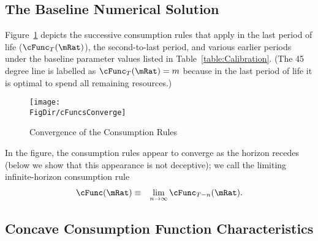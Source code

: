 \documentclass[titlepage]{\econtex}\providecommand{\texname}{BufferStockTheory}%
\providecommand{\FigDir}{Figures}
\providecommand{\TableDir}{./Tables}
\renewcommand{\FigDir}{Code/Python/Figures}
\begin{document}
\begin{comment}
In the case where the permanent shocks are lognormally distributed, we have
\begin{eqnarray}
\Ex[\pshk^{1-\CRRA}] & = &\exp((1-\CRRA)(-\sigma^{2}_{\pshk}/2)+(1-\CRRA)^{2}\sigma_{\pshk}^{2})
\\ & = & \exp((1-\CRRA)((-1/2)+(1-\CRRA))\sigma_{\pshk}^{2})
\\ & = & \exp((1-\CRRA)(1/2-\CRRA)\sigma_{\pshk}^{2})
%
\end{eqnarray}
\end{comment}

\begin{comment}
Equation
  \eqref{eq:GIC} can be raised to the $\CRRA$ power yielding the
  alternative form $(\Rfree \Discount) \PGroAdj^{-\CRRA} < 1$ which
  Deaton~\citeyearpar{deatonLiqConstr} imposed to guarantee that his
  problem defined a contraction mapping.
\end{comment}



\subsection{The Baseline Numerical Solution}

Figure~\ref{fig:CFuncsConverge} depicts the successive consumption
rules that apply in the last period of life ($\cFunc_{T}(\mRat)$), the
second-to-last period, and various earlier periods under the
baseline parameter values listed in Table~\ref{table:Calibration}.
(The 45 degree line is labelled as $\cFunc_{T}(\mRat) = m$ because in
the last period of life it is optimal to spend all remaining
resources.)



\begin{figure}[tbp]
\texttt{[image: \\FigDir/cFuncsConverge]}
\caption{Convergence of the Consumption Rules}
\label{fig:CFuncsConverge}
\end{figure}

In the figure, the consumption rules appear to converge as the horizon
recedes (below we show that this appearance is not deceptive); we
call the limiting infinite-horizon consumption rule
\begin{eqnarray}
\cFunc(\mRat) & \equiv & \lim_{n \rightarrow \infty} \cFunc_{T-n}(\mRat).
\end{eqnarray}

\subsection{Concave Consumption Function Characteristics}\label{sec:cExists}
\end{document}
